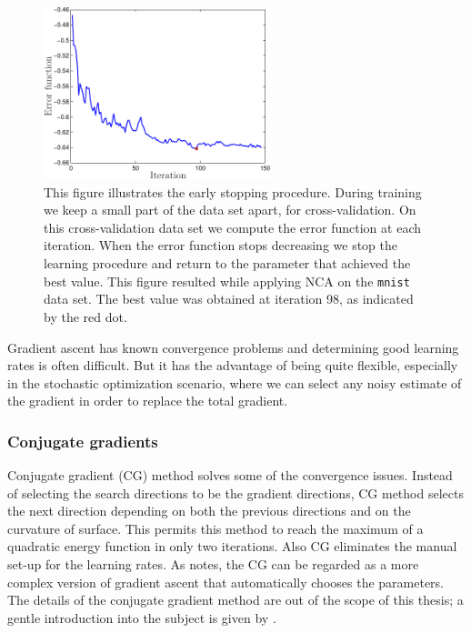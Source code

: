 	\begin{figure}
	 \centering\includegraphics[width=0.59\textwidth]{images/early-stopping}
	 \caption{This figure illustrates the early stopping procedure. During training we keep a small part of the data set apart, for cross-validation. On this cross-validation data set we compute the error function at each iteration. When the error function stops decreasing we stop the learning procedure and return to the parameter that achieved the best value. This figure resulted while applying NCA on the \texttt{mnist} data set. The best value was obtained at iteration 98, as indicated by the red dot.}
	 \label{fig:early-stopping}
	\end{figure}


	Gradient ascent has known convergence problems and determining good learning rates is often difficult. But it has the advantage of being quite flexible, especially in the stochastic optimization scenario, where we can select any noisy estimate of the gradient in order to replace the total gradient.

	\subsubsection*{Conjugate gradients}
	
	Conjugate gradient (CG) method solves some of the convergence issues. Instead of selecting the search directions to be the gradient directions, CG method selects the next direction depending on both the previous directions and on the curvature of surface. This permits this method to reach the maximum of a quadratic energy function in only two iterations. Also CG eliminates the manual set-up for the learning rates. As \citet{bishop1995} notes, the CG can be regarded as a more complex version of gradient ascent that automatically chooses the parameters. The details of the conjugate gradient method are out of the scope of this thesis; a gentle introduction into the subject is given by \citet{shewchuk1994}.

